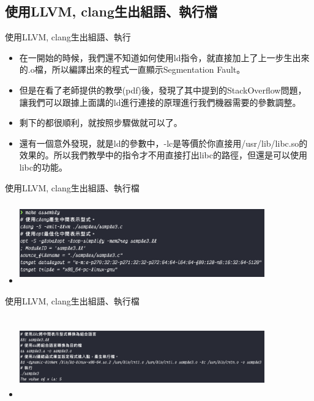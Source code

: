\documentclass{beamer}
\begin{document}
\subsection{使用LLVM, clang生出組語、執行檔}
\begin{frame}{使用LLVM, clang生出組語、執行}
\begin{itemize}
    \item 在一開始的時候，我們還不知道如何使用ld指令，就直接加上了上一步生出來的.o檔，所以編譯出來的程式一直顯示Segmentation Fault。
    \item 但是在看了老師提供的教學(pdf)後，發現了其中提到的StackOverflow問題\cite{GccOverflow}，讓我們可以跟據上面講的ld進行連接的原理進行我們機器需要的參數調整。
    \item 剩下的都很順利，就按照步驟做就可以了。
    \item 還有一個意外發現，就是ld的參數中，-lc是等價於你直接用/usr/lib/libc.so的效果的。所以我們教學中的指令才不用直接打出libc的路徑，但還是可以使用libc的功能。
\end{itemize}
    
\end{frame}

\begin{frame}{使用LLVM, clang生出組語、執行檔}
\begin{itemize}
    \item 
        \includegraphics[width=300pt,height=100pt]{238419442-7030003f-ea2c-4296-bcc7-9e7bc5deb41b}
\end{itemize}
\end{frame}

\begin{frame}{使用LLVM, clang生出組語、執行檔}
\begin{itemize}
    
    \item
        \includegraphics[width=300pt,height=100pt]{238419503-3338260e-882b-48e5-88de-9b67942e9dee}
\end{itemize}
\end{frame}
\end{document}
